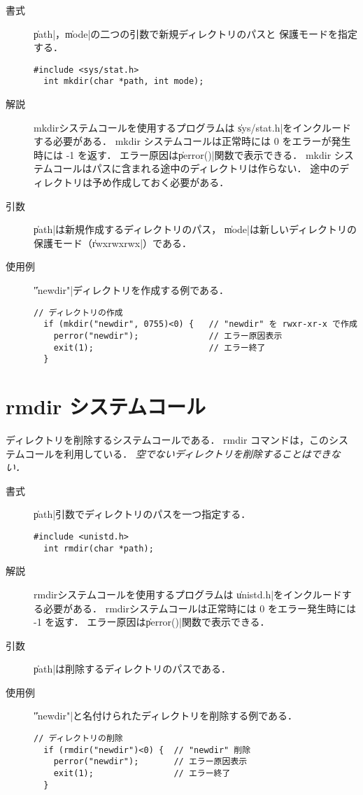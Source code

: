 \begin{description}
\item[書式] \|path|，\|mode|の二つの引数で新規ディレクトリのパスと
保護モードを指定する．
\begin{lstlisting}[numbers=none]
  #include <sys/stat.h>
  int mkdir(char *path, int mode);
\end{lstlisting}

\item[解説] mkdirシステムコールを使用するプログラムは
\|sys/stat.h|をインクルードする必要がある．
mkdir システムコールは正常時には 0 をエラーが発生時には -1 を返す．
エラー原因は\|perror()|関数で表示できる．
mkdir システムコールはパスに含まれる途中のディレクトリは作らない．
途中のディレクトリは予め作成しておく必要がある．

\item[引数] \|path|は新規作成するディレクトリのパス，
\|mode|は新しいディレクトリの保護モード（\|rwxrwxrwx|）である．

\item[使用例] \|"newdir"|ディレクトリを作成する例である．
\begin{lstlisting}[numbers=none]
  // ディレクトリの作成
  if (mkdir("newdir", 0755)<0) {   // "newdir" を rwxr-xr-x で作成
    perror("newdir");              // エラー原因表示
    exit(1);                       // エラー終了
  }
\end{lstlisting}
\end{description}

\section{rmdir システムコール}
ディレクトリを削除するシステムコールである．
rmdir コマンドは，このシステムコールを利用している．
\emph{空でないディレクトリを削除することはできない．}

\begin{description}
\item[書式] \|path|引数でディレクトリのパスを一つ指定する．
\begin{lstlisting}[numbers=none]
  #include <unistd.h>
  int rmdir(char *path);
\end{lstlisting}

\item[解説] rmdirシステムコールを使用するプログラムは
\|unistd.h|をインクルードする必要がある．
rmdirシステムコールは正常時には 0 をエラー発生時には -1 を返す．
エラー原因は\|perror()|関数で表示できる．

\item[引数] \|path|は削除するディレクトリのパスである．

\item[使用例] \|"newdir"|と名付けられたディレクトリを削除する例である．
\begin{lstlisting}[numbers=none]
  // ディレクトリの削除
  if (rmdir("newdir")<0) {  // "newdir" 削除
    perror("newdir");       // エラー原因表示
    exit(1);                // エラー終了
  }
\end{lstlisting}
\end{description}

